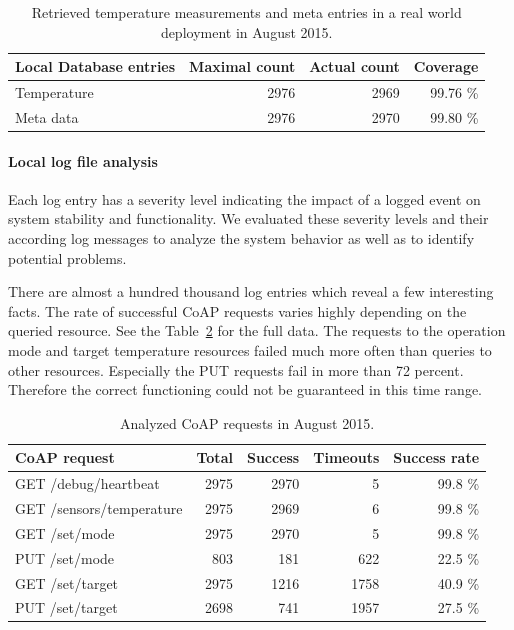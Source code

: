 \begin{table}[h]
	\begin{center}
		\begin{tabular}{ l | r r r }
			\toprule
			Local Database entries & Maximal count & Actual count & Coverage \\
			\midrule
			Temperature			& 2976 & 2969 & 99.76 \% \\
			Meta data			& 2976 & 2970 & 99.80 \% \\
			\bottomrule
		\end{tabular}
		\caption{Retrieved temperature measurements and meta entries in a real world deployment in August 2015.}
		\label{table:evaluation_local_database_coverage}
	\end{center}
\end{table}

\paragraph{Local log file analysis}

Each log entry has a severity level indicating the impact of a logged event on system stability and functionality.
We evaluated these severity levels and their according log messages to analyze the system behavior as well as to identify potential problems.

There are almost a hundred thousand log entries which reveal a few interesting facts.
The rate of successful CoAP requests varies highly depending on the queried resource.
See the Table~\ref{table:evaluation_coap_requests} for the full data.
The requests to the operation mode and target temperature resources failed much more often than queries to other resources.
Especially the PUT requests fail in more than 72 percent.
Therefore the correct functioning could not be guaranteed in this time range.

\begin{table}[h]
	\begin{center}
		\begin{tabular}{ l | r r r r }
			\toprule
			CoAP request	& Total	& Success	& Timeouts	& Success rate \\
			\midrule
			GET /debug/heartbeat	& 2975	& 2970	& 5	& 99.8 \% \\
			GET /sensors/temperature	& 2975	& 2969	& 6	& 99.8 \% \\
			GET /set/mode	& 2975	& 2970	& 5	& 99.8 \% \\
			PUT /set/mode	& 803	& 181	& 622	& 22.5 \% \\
			GET /set/target	& 2975	& 1216	& 1758	& 40.9 \% \\
			PUT /set/target	& 2698	& 741	& 1957	& 27.5 \% \\
			\bottomrule
		\end{tabular}
		\caption{Analyzed CoAP requests in August 2015.}
		\label{table:evaluation_coap_requests}
	\end{center}
\end{table}

